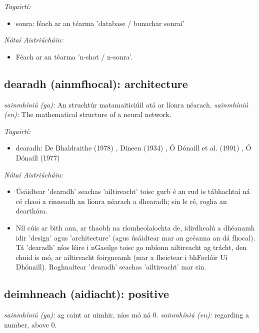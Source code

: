 \documentclass{article}
\begin{document}
 \noindent \textit{Tagairtí:}
\begin{itemize}
	\item sonra: féach ar an téarma 'database / bunachar sonraí'
\end{itemize}

 \noindent \textit{Nótaí Aistriúcháin:}
\begin{itemize}
	\item Féach ar an téarma 'n-shot / n-sonra'.
\end{itemize}


\subsection*{dearadh (ainmfhocal): architecture} 
 \noindent \textit{sainmhíniú (ga):} An struchtúr matamaiticiúil atá ar líonra néarach.
\newline\newline
 \noindent \textit{sainmhíniú (en):} The mathematical structure of a neural network.
\newline

 \noindent \textit{Tagairtí:}
\begin{itemize}
	\item dearadh: De Bhaldraithe (1978) \cite{de-bhaldraithe}, Dineen (1934) \cite{dineen}, Ó Dónaill et al. (1991) \cite{focloir-beag}, Ó Dónaill (1977) \cite{odonaill}
\end{itemize}

 \noindent \textit{Nótaí Aistriúcháin:}
\begin{itemize}
	\item Úsáidtear 'dearadh' seachas 'ailtireacht' toisc gurb é an rud is tábhachtaí ná cé chaoi a rinneadh an líonra néarach a dhearadh; sin le ré, rogha an dearthóra.
	\item Níl cúis ar bith ann, ar thaobh na ríomheolaíochta de, idirdhealú a dhéanamh idir 'design' agus 'architecture' (agus úsáidtear mar an gcéanna an dá fhocal). Tá 'dearadh' níos léire i nGaeilge toisc go mbíonn ailtireacht ag trácht, den chuid is mó, ar ailtireacht foirgneamh (mar a fheictear i bhFoclóir Uí Dhónaill). Roghnaítear 'dearadh' seachas 'ailtireacht' mar sin.
\end{itemize}


\subsection*{deimhneach (aidiacht): positive} 
 \noindent \textit{sainmhíniú (ga):} ag caint ar uimhir, níos mó ná 0.
\newline\newline
 \noindent \textit{sainmhíniú (en):} regarding a number, above 0.
\newline
\end{document}
